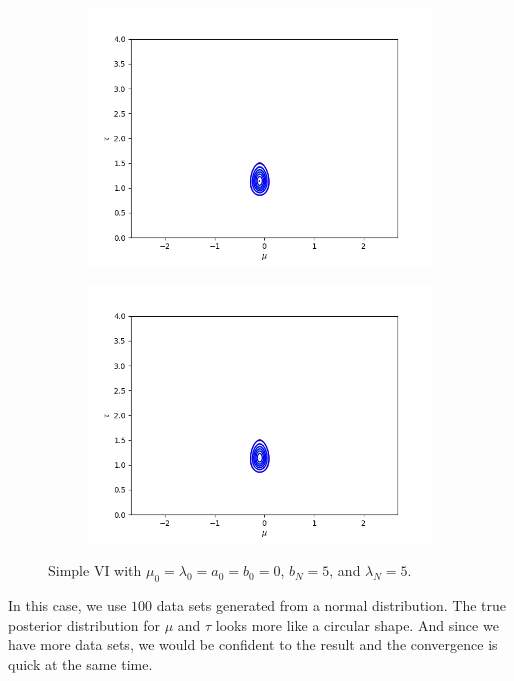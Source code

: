\documentclass[11pt]{extarticle}
\newcommand{\0}{\mathbf{0}}
\renewcommand{\(}{\left(}
\renewcommand{\)}{\right)}
\theoremstyle{definition}
\begin{document}
\begin{enumerate}
\begin{figure}[!ht]
\begin{subfigure}{.4\textwidth}
			\centering
			\includegraphics[width=\linewidth]{2_4_3_3}
		\end{subfigure}
		\begin{subfigure}{.4\textwidth}
			\centering
			\includegraphics[width=\linewidth]{2_4_3_6}
		\end{subfigure}
		\caption{Simple VI with $\mu_{0} = \lambda_{0} = a_{0} = b_{0} = 0$, $b_{N} = 5$, and $\lambda_{N} = 5$.}
		\label{fig:2_4_3}
	\end{figure}
	\par In this case, we use $100$ data sets generated from a normal distribution. The true posterior distribution for $\mu$ and $\tau$ looks more like a circular shape. And since we have more data sets, we would be confident to the result and the convergence is quick at the same time.
\end{enumerate}
\end{document}
